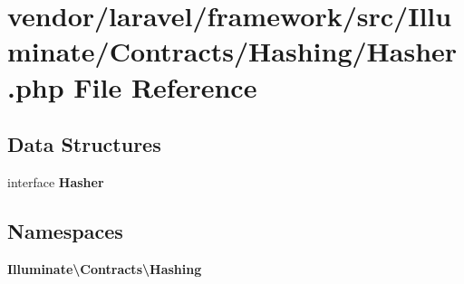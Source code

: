 \section{vendor/laravel/framework/src/\+Illuminate/\+Contracts/\+Hashing/\+Hasher.php File Reference}
\label{_hasher_8php}
\subsection*{Data Structures}
\begin{DoxyCompactItemize}
\item 
interface {\bf Hasher}
\end{DoxyCompactItemize}
\subsection*{Namespaces}
\begin{DoxyCompactItemize}
\item 
 {\bf Illuminate\textbackslash{}\+Contracts\textbackslash{}\+Hashing}
\end{DoxyCompactItemize}
